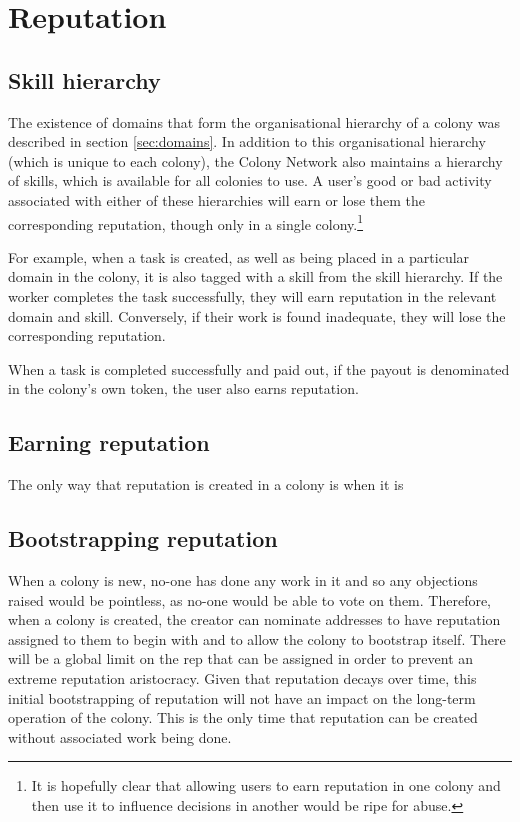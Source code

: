 \section{Reputation}



\subsection{Skill hierarchy}

The existence of domains that form the organisational hierarchy of a colony was described in section \ref{sec:domains}. In addition to this organisational hierarchy (which is unique to each colony), the Colony Network also maintains a hierarchy of skills, which is available for all colonies to use. A user's good or bad activity associated with either of these hierarchies will earn or lose them the corresponding reputation, though only in a single colony.\footnote{It is hopefully clear that allowing users to earn reputation in one colony and then use it to influence decisions in another would be ripe for abuse.}

For example, when a task is created, as well as being placed in a particular domain in the colony, it is also tagged with a skill from the skill hierarchy. If the worker completes the task successfully, they will earn reputation in the relevant domain and skill. Conversely, if their work is found inadequate, they will lose the corresponding reputation.

When a task is completed successfully and paid out, if the payout is denominated in the colony's own token, the user also earns reputation. 

\subsection{Earning reputation}
The only way that reputation is created in a colony is when it is 

\subsection{Bootstrapping reputation}

When a colony is new, no-one has done any work in it and so any objections raised would be pointless, as no-one would be able to vote on them. Therefore, when a colony is created, the creator can nominate addresses to have reputation assigned to them to begin with and to allow the colony to bootstrap itself. There will be a global limit on the rep that can be assigned in order to prevent an extreme reputation aristocracy. Given that reputation decays over time, this initial bootstrapping of reputation will not have an impact on the long-term operation of the colony. This is the only time that reputation can be created without associated work being done.

